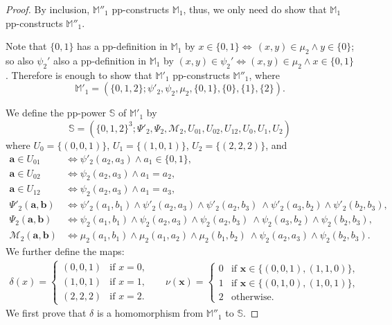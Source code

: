 \documentclass[12pt]{amsart}
\theoremstyle{definition}
\theoremstyle{definition}
\newcommand{\struct}[1]{\mathbb{#1}}
\begin{document}
\begin{proof}
By inclusion, $\struct{M}''_1$ pp-constructs $\struct{M}_1$, thus, we only need do show that $\struct{M}_1$ pp-constructs $\struct{M}''_1$.

Note that $\{0,1\}$ has a pp-definition in $\mathbb M_1$ by $x \in \{0,1\} \Leftrightarrow  \, (x,y) \in  \mu_2\wedge y \in \{0\}$; so also $\psi_2'$ also a pp-definition in $\mathbb M_1$ by $(x,y) \in \psi_2' \Leftrightarrow (x,y) \in\mu_2 \land x \in \{0,1\}$. Therefore is enough to show that $\struct{M}'_1$ pp-constructs $\struct{M}''_1$, where 
\[\struct{M}'_1 = (\{0,1,2\};\psi'_2, \psi_2, \mu_2, \{0,1\}, \{0\},\{1\},\{2\}).\]

We define the pp-power $\struct{S}$ of $\struct{M}'_1$ by
\[\struct{S}=(\{0,1,2\}^3;\Psi'_2,\Psi_2,\mathcal M_2,U_{01},U_{02},U_{12},U_0,U_1,U_2)\]
where $U_0 = \{(0,0,1)\}$, $U_1 = \{(1,0,1)\}$, $U_2 = \{(2,2,2)\}$, and
\begin{align*}
\boldsymbol{a}\in U_{01} &\Leftrightarrow\psi'_2(a_2,a_3)\wedge a_1\in\{0,1\},
    \\\boldsymbol{a} \in U_{02} &\Leftrightarrow \psi_2(a_2,a_3) \wedge a_1=a_2,
    \\ \boldsymbol{a} \in U_{12} &\Leftrightarrow \psi_2(a_2,a_3)\wedge a_1=a_3,\\
    \Psi'_2(\boldsymbol{a},\boldsymbol{b}) &\Leftrightarrow \psi'_2(a_1,b_1) \wedge \psi'_2(a_2,a_3) \wedge \psi'_2(a_2,b_3)\ \wedge \psi'_2(a_3,b_2)\wedge \psi'_2(b_2,b_3),
    \\\Psi_2(\boldsymbol{a},\boldsymbol{b}) &\Leftrightarrow \psi_2(a_1,b_1) \wedge \psi_2(a_2,a_3) \wedge \psi_2(a_2,b_3)\ \wedge \psi_2(a_3,b_2)\wedge \psi_2(b_2,b_3),\\
    \mathcal M_2(\boldsymbol{a},\boldsymbol{b}) &\Leftrightarrow \mu_2(a_1,b_1)\wedge \mu_2(a_1,a_2)\wedge \mu_2(b_1,b_2)\ \wedge \psi_2(a_2,a_3)\wedge \psi_2(b_2,b_3).
\end{align*}
We further define the maps:
\begin{align*}\label{eq:mapHom3}
 \delta(x)=\begin{cases}
   (0,0,1) & \text{if } x = 0,\\
   (1,0,1) & \text{if } x = 1,\\
   (2,2,2) & \text{if } x = 2.
   \end{cases}
 &&\nu(\boldsymbol{x})=\begin{cases}
   0 & \text{if } \boldsymbol{x} \in \{(0,0,1),(1,1,0)\},\\
   1 & \text{if } \boldsymbol{x} \in \{(0,1,0),(1,0,1)\},\\
   2 & \text{otherwise}.
   \end{cases}
\end{align*}
We first prove that $\delta$ is a homomorphism from $\struct{M}''_1$ to $\struct{S}$.


\end{proof}
\end{document}
